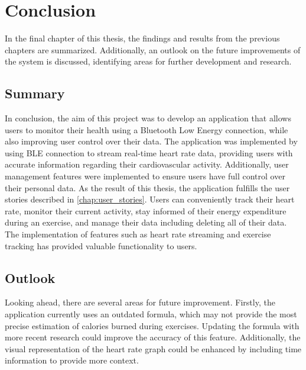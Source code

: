 \chapter{Conclusion}
In the final chapter of this thesis, the findings and results from the previous chapters are summarized. 
Additionally, an outlook on the future improvements of the system is discussed, identifying areas for further development and research. 

\section{Summary}
In conclusion, the aim of this project was to develop an application that allows users to monitor their health using a Bluetooth Low Energy connection, while also improving user control over their data. 
The application was implemented by using BLE connection to stream real-time heart rate data, providing users with accurate information regarding their cardiovascular activity. 
Additionally, user management features were implemented to ensure users have full control over their personal data.
As the result of this thesis, the application fulfills the user stories described in \autoref{chap:user_stories}.
Users can conveniently track their heart rate, monitor their current activity, stay informed of their energy expenditure during an exercise, and manage their data including deleting all of their data. 
The implementation of features such as heart rate streaming and exercise tracking has provided valuable functionality to users.

\section{Outlook}
Looking ahead, there are several areas for future improvement. 
Firstly, the application currently uses an outdated formula, which may not provide the most precise estimation of calories burned during exercises. 
Updating the formula with more recent research could improve the accuracy of this feature.
Additionally, the visual representation of the heart rate graph could be enhanced by including time information to provide more context.